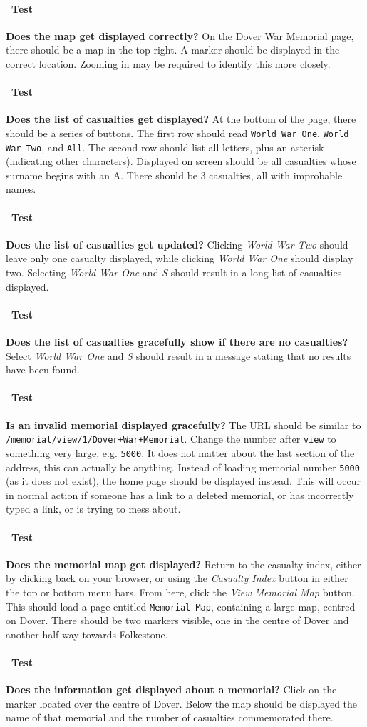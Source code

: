 \documentclass[12pt]{article}
\newcounter{Test}
\newcommand{\test}[1]{%
\stepcounter{Test}%
\paragraph{\Circle\ Test \theTest} \textbf{#1} }
\begin{document}
\test{Does the map get displayed correctly?}
On the Dover War Memorial page, there should be a map in the top right. A marker should be displayed in the correct location. Zooming in may be required to identify this more closely.

\test{Does the list of casualties get displayed?}
At the bottom of the page, there should be a series of buttons. The first row should read \texttt{World War One}, \texttt{World War Two}, and \texttt{All}. The second row should list all letters, plus an asterisk (indicating other characters). Displayed on screen should be all casualties whose surname begins with an A. There should be 3 casualties, all with improbable names.

\test{Does the list of casualties get updated?}
Clicking \textit{World War Two} should leave only one casualty displayed, while clicking \textit{World War One} should display two. Selecting \textit{World War One} and \textit{S} should result in a long list of casualties displayed.

\test{Does the list of casualties gracefully show if there are no casualties?}
Select \textit{World War One} and \textit{S} should result in a message stating that no results have been found.

\test{Is an invalid memorial displayed gracefully?}
The URL should be similar to \texttt{/memorial/view/1/Dover+War+Memorial}. Change the number after \texttt{view} to something very large, e.g. \texttt{5000}. It does not matter about the last section of the address, this can actually be anything. Instead of loading memorial number \texttt{5000} (as it does not exist), the home page should be displayed instead. This will occur in normal action if someone has a link to a deleted memorial, or has incorrectly typed a link, or is trying to mess about.

\test{Does the memorial map get displayed?}
Return to the casualty index, either by clicking back on your browser, or using the \textit{Casualty Index} button in either the top or bottom menu bars. From here, click the \textit{View Memorial Map} button. This should load a page entitled \texttt{Memorial Map}, containing a large map, centred on Dover. There should be two markers visible, one in the centre of Dover and another half way towards Folkestone.

\test{Does the information get displayed about a memorial?}
Click on the marker located over the centre of Dover. Below the map should be displayed the name of that memorial and the number of casualties commemorated there.
\end{document}
